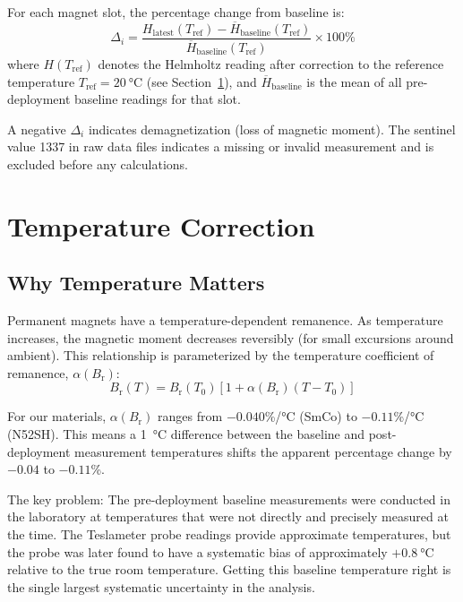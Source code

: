 \documentclass[11pt,letterpaper]{article}
\newcommand{\smco}{SmCo}
\newcommand{\Br}{B_\mathrm{r}}
\newcommand{\alphar}{\alpha(\Br)}
\begin{document}
For each magnet slot, the percentage change from baseline is:
\begin{equation}
    \Delta_i = \frac{H_\mathrm{latest}(T_\mathrm{ref}) - \overline{H}_\mathrm{baseline}(T_\mathrm{ref})}{\overline{H}_\mathrm{baseline}(T_\mathrm{ref})} \times 100\%
    \label{eq:pct_change}
\end{equation}
where $H(T_\mathrm{ref})$ denotes the Helmholtz reading after correction to the
reference temperature $T_\mathrm{ref} = \SI{20}{\celsius}$ (see
Section~\ref{sec:temperature}), and $\overline{H}_\mathrm{baseline}$ is the
mean of all pre-deployment baseline readings for that slot.

A negative $\Delta_i$ indicates demagnetization (loss of magnetic
moment). The sentinel value 1337 in raw data files indicates a missing or
invalid measurement and is excluded before any calculations.

\section{Temperature Correction}
\label{sec:temperature}

\subsection{Why Temperature Matters}

Permanent magnets have a temperature-dependent remanence. As temperature
increases, the magnetic moment decreases reversibly (for small excursions around
ambient). This relationship is parameterized by the temperature coefficient of
remanence, $\alphar$:
\begin{equation}
    \Br(T) = \Br(T_0) \left[ 1 + \alphar (T - T_0) \right]
\end{equation}

For our materials, $\alphar$ ranges from $-0.040$\%/\si{\celsius} (\smco{})
to $-0.11$\%/\si{\celsius} (N52SH). This means a \SI{1}{\celsius} difference
between the baseline and post-deployment measurement temperatures shifts the
apparent percentage change by $-0.04$ to $-0.11$\%.

The key problem: The pre-deployment baseline measurements were
conducted in the laboratory at temperatures that were not directly and
precisely measured at the time. The Teslameter probe readings provide
approximate temperatures, but the probe was later found to have a systematic
bias of approximately $+\SI{0.8}{\celsius}$ relative to the true room
temperature. Getting this baseline temperature right is the single largest
systematic uncertainty in the analysis.
\end{document}
